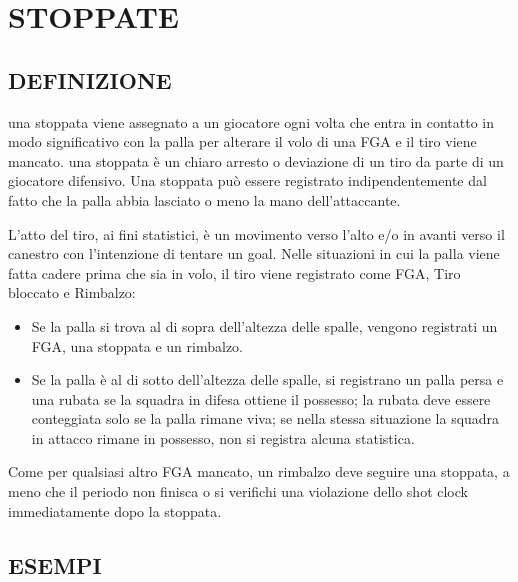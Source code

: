 \section{STOPPATE}
\sectionline
\subsection{DEFINIZIONE}
\subsectionline

una stoppata viene assegnato a un giocatore ogni volta che entra in contatto in modo significativo con la palla per alterare il volo di una FGA e il tiro 
viene mancato. una stoppata è un chiaro arresto o deviazione di un tiro da parte di un giocatore difensivo. Una stoppata può essere registrato 
indipendentemente dal fatto che la palla abbia lasciato o meno la mano dell'attaccante.

L'atto del tiro, ai fini statistici, è un movimento verso l'alto e/o in avanti verso il canestro con l'intenzione di tentare un goal. Nelle situazioni in cui la palla viene fatta cadere prima che sia in volo, il tiro viene registrato come FGA, Tiro bloccato e Rimbalzo:

\begin{itemize}
    \item Se la palla si trova al di sopra dell'altezza delle spalle, vengono registrati un FGA, una stoppata e un rimbalzo.
    \item Se la palla è al di sotto dell'altezza delle spalle, si registrano un palla persa e una rubata se la squadra in difesa ottiene il possesso; la rubata 
    deve essere conteggiata solo se la palla rimane viva; se nella stessa situazione la squadra in attacco rimane in possesso, non si registra 
    alcuna statistica.
\end{itemize}

Come per qualsiasi altro FGA mancato, un rimbalzo deve seguire una stoppata, a meno che il periodo non finisca o si verifichi una violazione dello shot clock immediatamente dopo la stoppata.

\subsection{ESEMPI}
\subsectionline
{}

